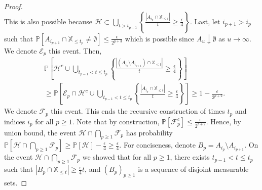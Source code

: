 \documentclass[aos]{imsart}
\theoremstyle{plain}
\theoremstyle{remark}
\newcommand{\Ecal}{\mathcal{E}}
\newcommand{\Fcal}{\mathcal{F}}
\newcommand{\Hcal}{\mathcal{H}}
\newcommand{\Pbb}{\mathbb{P}}
\newcommand{\Xbb}{\mathbb{X}}
\newcommand{\1}{\mathbbm{1}}%
\begin{document}
\begin{proof}
\begin{equation*}
\end{equation*}
This is also possible because $\Hcal\subset \bigcup_{t>t_{p-1}}\left\{\frac{|A_{i_p}\cap\Xbb_{\leq t}|}{t} \geq \frac{\epsilon}{4}\right\}$. Last, let $i_{p+1}> i_p$ such that $\Pbb[A_{i_{p+1}}\cap \Xbb_{\leq t_p}\neq\emptyset]\leq \frac{\epsilon}{2^{p+3}}$ which is possible since $A_u\downarrow \emptyset$ as $u\to\infty$. We denote $\Ecal_p$ this event. Then,
\begin{align*}
    &\Pbb\left[\Hcal^c \cup \bigcup_{t_{p-1}<t\leq t_p}\left\{\frac{|(A_{i_p}\setminus A_{i_{p+1}})\cap\Xbb_{\leq t}|}{t} 
    \geq \frac{\epsilon}{4}\right\}\right]\\
    &\geq \Pbb\left[\Ecal_p\cap \Hcal^c \cup \bigcup_{t_{p-1}<t\leq t_p}\left\{\frac{|A_{i_p}\cap\Xbb_{\leq t}|}{t}\geq \frac{\epsilon}{4}\right\}\right] \geq 1-\frac{\epsilon}{2^{p+2}}.
\end{align*}
We denote $\Fcal_p$ this event. This ends the recursive construction of times $t_p$ and indices $i_p$ for all $p\geq 1$. Note that by construction, $\Pbb[\Fcal_p^c]\leq \frac{\epsilon}{2^{p+2}}$. Hence, by union bound, the event $\Hcal\cap\bigcap_{p\geq 1}\Fcal_p$ has probability $\Pbb[\Hcal\cap\bigcap_{p\geq 1}\Fcal_p]\geq \Pbb[\Hcal]-\frac{\epsilon}{4}\geq \frac{\epsilon}{4}$. For conciseness, denote $B_p = A_{i_p}\setminus A_{i_{p+1}}$. On the event $\Hcal\cap\bigcap_{p\geq 1}\Fcal_p$ we showed that for all $p\geq 1$, there exists $t_{p-1}<t\leq t_p$ such that $|B_p\cap\Xbb_{\leq t}| \geq \frac{\epsilon}{4} t$, and $(B_p)_{p\geq 1}$ is a sequence of disjoint measurable sets.


\end{proof}
\end{document}
